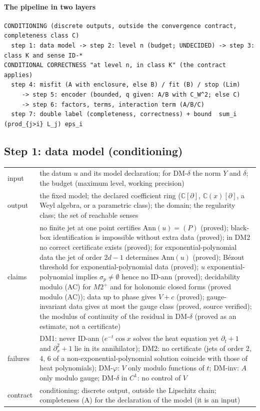 \documentclass[11pt]{article}
\theoremstyle{plain}
\theoremstyle{definition}
\theoremstyle{remark}
\newcommand{\C}{\mathbb{C}}
\begin{document}
\paragraph{The pipeline in two layers}
\begin{verbatim}
CONDITIONING (discrete outputs, outside the convergence contract, completeness class C)
  step 1: data model -> step 2: level n (budget; UNDECIDED) -> step 3: class K and sense ID-*
CONDITIONAL CORRECTNESS "at level n, in class K" (the contract applies)
  step 4: misfit (A with enclosure, else B) / fit (B) / stop (Lim)
     -> step 5: encoder (bounded, q given: A/B with C_W^2; else C)
     -> step 6: factors, terms, interaction term (A/B/C)
  step 7: double label (completeness, correctness) + bound  sum_i (prod_{j>i} L_j) eps_i
\end{verbatim}

\subsection*{Step 1: data model (conditioning)}
\begin{tabular}{@{}p{2.2cm}p{9.6cm}@{}}
\toprule
input & the datum $u$ and its model declaration; for DM-$\delta$ the norm $Y$ and $\delta$; the budget (maximum level, working precision)\\
output & the fixed model; the declared coefficient ring ($\C[\partial]$, $\C(x)[\partial]$, a Weyl algebra, or a parametric class); the domain; the regularity class; the set of reachable senses\\
claims & no finite jet at one point certifies $\mathrm{Ann}(u)=(P)$ (proved); black-box identification is impossible without extra data (proved); in DM2 no correct certificate exists (proved); for exponential-polynomial data the jet of order $2d-1$ determines $\mathrm{Ann}(u)$ (proved); Bézout threshold for exponential-polynomial data (proved); $u$ exponential-polynomial implies $\sigma_p\ne\emptyset$ hence no ID-ann (proved); decidability modulo (AC) for $M2^+$ and for holonomic closed forms (proved modulo (AC)); data up to phase gives $V+c$ (proved); gauge-invariant data gives at most the gauge class (proved, source verified); the modulus of continuity of the residual in DM-$\delta$ (proved as an estimate, not a certificate)\\
failures & DM1: never ID-ann ($e^{-t}\cos x$ solves the heat equation yet $\partial_t+1$ and $\partial_x^2+1$ lie in its annihilator); DM2: no certificate (jets of order 2, 4, 6 of a non-exponential-polynomial solution coincide with those of heat polynomials); DM-$\varphi$: $V$ only modulo functions of $t$; DM-inv: $A$ only modulo gauge; DM-$\delta$ in $C^1$: no control of $V$\\
contract & conditioning: discrete output, outside the Lipschitz chain; completeness (A) for the declaration of the model (it is an input)\\
\bottomrule
\end{tabular}
\end{document}

